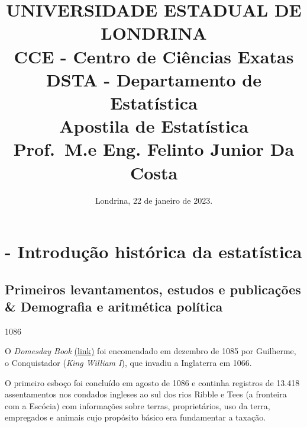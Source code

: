 \documentclass[
]{book}
\title{UNIVERSIDADE ESTADUAL DE LONDRINA\\
CCE - Centro de Ciências Exatas\\
DSTA - Departamento de Estatística\\
Apostila de Estatística\\
Prof.~M.e Eng. Felinto Junior Da Costa}
\author{}
\date{\vspace{-2.5em}Londrina, 22 de janeiro de 2023.}
\begin{document}
\maketitle

{
\setcounter{tocdepth}{1}
\tableofcontents
}
\hypertarget{section}{%
\chapter*{}\label{section}}

\hypertarget{historia}{%
\chapter{- Introdução histórica da estatística}\label{historia}}

\hypertarget{primeiros-levantamentos-estudos-e-publicauxe7uxf5es-demografia-e-aritmuxe9tica-poluxedtica}{%
\section{Primeiros levantamentos, estudos e publicações \& Demografia e aritmética política}\label{primeiros-levantamentos-estudos-e-publicauxe7uxf5es-demografia-e-aritmuxe9tica-poluxedtica}}

1086

\hfill\break

O \emph{Domesday Book} \href{http://www.nationalarchives.gov.uk/education/resources/domesday-book/}{(link)}
foi encomendado em dezembro de 1085 por Guilherme, o Conquistador (\emph{King William I}), que invadiu a Inglaterra em 1066.

O primeiro esboço foi concluído em agosto de 1086 e continha registros de 13.418 assentamentos nos condados ingleses ao sul dos rios Ribble e Tees (a fronteira com a Escócia) com informações sobre terras, proprietários, uso da terra, empregados e animais cujo propósito básico era fundamentar a taxação.

\hfill\break
\end{document}
